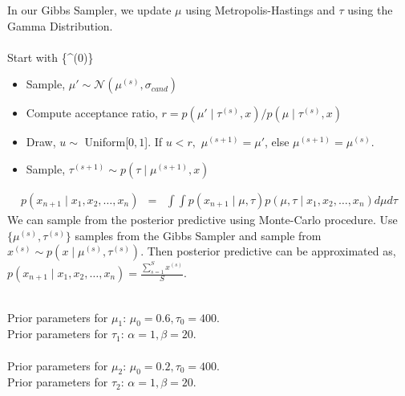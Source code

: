 \documentclass{article}
\begin{document}
In our Gibbs Sampler, we update $\mu$ using Metropolis-Hastings and $\tau$ using the Gamma Distribution.\\

\\

Start with \{\mu^{(0)}\}

\begin{itemize}
\item Sample, $\mu' \sim \mathcal{N}(\mu^{(s)},\sigma_{cand})$
\item Compute acceptance ratio, $r = p(\mu' \mid \tau^{(s)},x)/p(\mu \mid \tau^{(s)},x)$
\item Draw, $u \sim$ Uniform[$0,1$]. If $u < r,$ $\mu^{(s+1)} = \mu'$, else $\mu^{(s+1)} = \mu^{(s)}$.
\item Sample, $\tau^{(s+1)} \sim p(\tau \mid \mu^{(s+1)},x)$
\end{itemize}

\begin{eqnarray*}
p(x_{n+1} \mid x_1,x_2,\ldots,x_n) &=& \int{\int{p(x_{n+1} \mid \mu,\tau)p(\mu,\tau \mid x_1,x_2,\ldots,x_n)d\mu}d\tau}
\end{eqnarray*}
We can sample from the posterior predictive using Monte-Carlo procedure. Use $\{\mu^{(s)},\tau^{(s)}\}$ samples from the Gibbs Sampler and sample from $x^{(s)} \sim p(x \mid \mu^{(s)},\tau^{(s)})$. Then posterior predictive can be approximated as, $p(x_{n+1} \mid x_1,x_2,\ldots,x_n) = \frac{\sum_{s=1}^{S}{x^{(s)}}}{S}.$

\pagebreak
{}\\
Prior parameters for $\mu_1$: $\mu_0 = 0.6, \tau_0 = 400.$\\
Prior parameters for $\tau_1$: $\alpha = 1, \beta = 20.$\\

\\
Prior parameters for $\mu_2$: $\mu_0 = 0.2, \tau_0 = 400.$\\
Prior parameters for $\tau_2$: $\alpha = 1, \beta = 20.$\\
\end{document}
